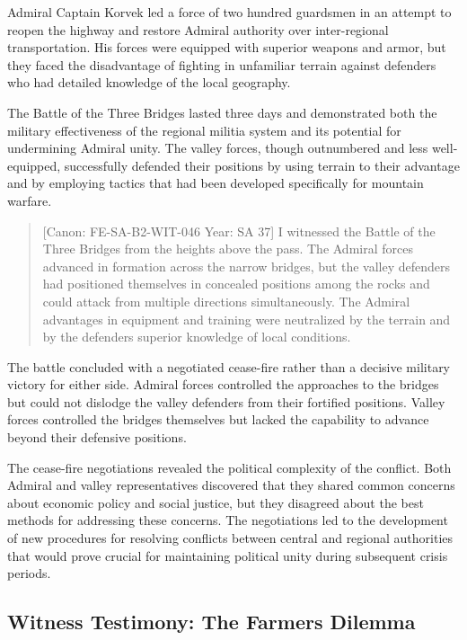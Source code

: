 Admiral Captain Korvek led a force of two hundred guardsmen in an
attempt to reopen the highway and restore Admiral authority over
inter-regional transportation. His forces were equipped with superior
weapons and armor, but they faced the disadvantage of fighting in
unfamiliar terrain against defenders who had detailed knowledge of the
local geography.

The Battle of the Three Bridges lasted three days and demonstrated both
the military effectiveness of the regional militia system and its
potential for undermining Admiral unity. The valley forces, though
outnumbered and less well-equipped, successfully defended their
positions by using terrain to their advantage and by employing tactics
that had been developed specifically for mountain warfare.

\begin{quote}
{[}Canon: FE-SA-B2-WIT-046 \textbar{} Year: SA 37{]} I witnessed the
Battle of the Three Bridges from the heights above the pass. The Admiral
forces advanced in formation across the narrow bridges, but the valley
defenders had positioned themselves in concealed positions among the
rocks and could attack from multiple directions simultaneously. The
Admiral advantages in equipment and training were neutralized by the
terrain and by the defenders\textquotesingle{} superior knowledge of
local conditions.
\end{quote}

The battle concluded with a negotiated cease-fire rather than a decisive
military victory for either side. Admiral forces controlled the
approaches to the bridges but could not dislodge the valley defenders
from their fortified positions. Valley forces controlled the bridges
themselves but lacked the capability to advance beyond their defensive
positions.

The cease-fire negotiations revealed the political complexity of the
conflict. Both Admiral and valley representatives discovered that they
shared common concerns about economic policy and social justice, but
they disagreed about the best methods for addressing these concerns. The
negotiations led to the development of new procedures for resolving
conflicts between central and regional authorities that would prove
crucial for maintaining political unity during subsequent crisis
periods.

\subsection{Witness Testimony: The Farmer\textquotesingle s
Dilemma}\label{witness-testimony-the-farmers-dilemma}

